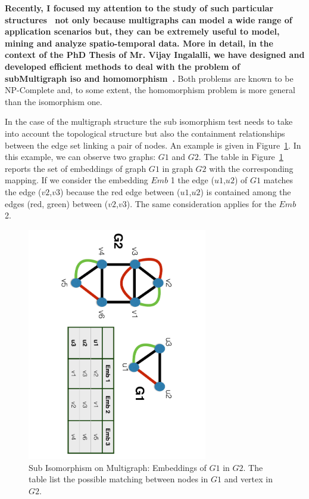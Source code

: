 \textbf{Recently, I focused my attention to the study of such particular structures~\cite{PapalexakisAI13, RedondoSIZP15, Ingalalli16, Bourqui16} not only because multigraphs can model a wide range of application scenarios but, they can be extremely useful to model, mining and analyze spatio-temporal data. More in detail, in the context of the PhD Thesis of Mr. Vijay Ingalalli, we have designed and developed efficient methods to deal with the problem of subMultigraph iso and homomorphism~\cite{Ingalalli15,Ingalalli16}.} Both problems are known to be NP-Complete and, to some extent, the homomorphism problem is more general than the isomorphism one. %

In the case of the multigraph structure the sub isomorphism test needs to take into account the topological structure but also the containment relationships between the edge set linking a pair of nodes. An example is given in Figure~\ref{fig:SubMultiGraphIso}. In this example, we can observe two graphs: $G1$ and $G2$. The table in Figure~\ref{fig:SubMultiGraphIso} reports the set of embeddings of graph $G1$ in graph $G2$ with the corresponding mapping. If we consider the embedding $Emb$ 1 the edge ($u1$,$u2$) of $G1$ matches the edge ($v2$,$v3$) because the red edge between ($u1$,$u2$) is contained among the edges (red, green) between ($v2$,$v3$). The same consideration applies for the $Emb$ 2. 


\begin{figure}[!ht]
\begin{center}
	\includegraphics[angle=90,width=0.70\textwidth]{Figures/iso_multi.pdf}
\end{center}
\caption{Sub Isomorphism on Multigraph: Embeddings of $G1$ in $G2$. The table list the possible matching between nodes in $G1$ and vertex in $G2$.  \label{fig:SubMultiGraphIso}}
\end{figure}

